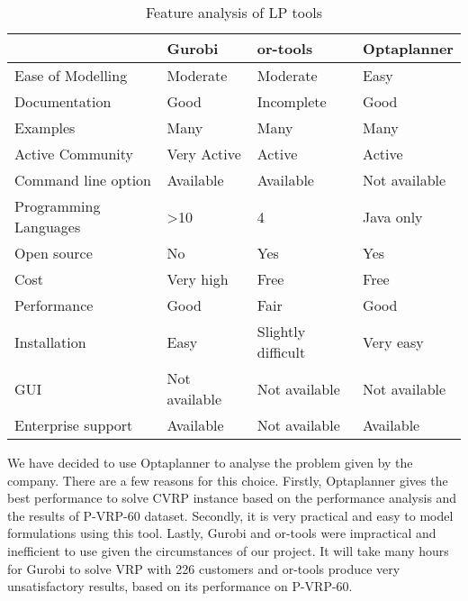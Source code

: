 \begin{table}[!ht]
\centering
\begin{tabular}{|l|l|l|l|}
\hline
                      & Gurobi        & or-tools & Optaplanner \\ \hline
Ease of Modelling     & Moderate      &   Moderate      &    Easy    \\ \hline
Documentation         & Good         &  Incomplete   &   Good       \\ \hline
Examples              & Many        &  Many        &     Many        \\ \hline
Active Community      & Very Active  &  Active     &  Active        \\ \hline
Command line option   & Available            &  Available         &  Not available          \\ \hline
Programming Languages & >10               &    4      &    Java only         \\ \hline
Open source           &   No            &    Yes      &     Yes        \\ \hline
Cost                  &  Very high     &     Free     &       Free      \\ \hline
Performance           &  Good             &   Fair        &    Good         \\ \hline
Installation          &  Easy            &   Slightly difficult      &     Very easy        \\ \hline
GUI                   &  Not available             &   Not available        &  Not available            \\ \hline
Enterprise support     &  Available             &   Not available        &     Available        \\ \hline
\end{tabular}
\caption{Feature analysis of LP tools}
\label{feature-analysis}
\end{table}

We have decided to use Optaplanner to analyse the problem given by the company. There are a few reasons
for this choice. Firstly, Optaplanner gives the best performance to solve CVRP instance based on the performance analysis
and the results of P-VRP-60 dataset.  Secondly, it is very practical and easy to model formulations using
this tool. Lastly, Gurobi and or-tools were impractical and inefficient to use given the circumstances of our project. It will take many hours
for Gurobi to solve VRP with 226 customers and or-tools produce very unsatisfactory results, based on its performance on P-VRP-60.

